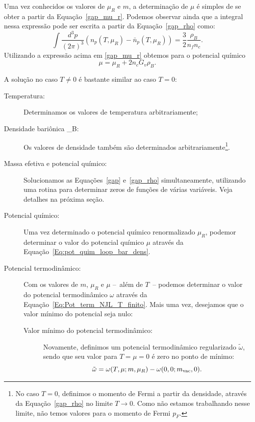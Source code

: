 Uma vez conhecidos os valores de $\mu_R$ e $m$, a determinação de $\mu$ é simples de se obter a partir da Equação~\eqref{gap_mu_r}. Podemos observar ainda que a integral nessa expressão pode ser escrita a partir da Equação~\eqref{gap_rho} como:
\begin{equation}
	\int \frac{d^3p}{(2\pi)^3}(n_p(T, \mu_R) - \bar{n}_p(T, \mu_R)) = \frac{3}{2} \frac{\rho_B}{n_f n_c}.
\end{equation}
%
Utilizando a expressão acima em \eqref{gap_mu_r} obtemos para o potencial químico
\begin{equation}\label{Eq:pot_quim_loop_bar_dens}
	\mu = \mu_R + 2 n_c G_v \rho_B.
\end{equation}

A solução no caso $T \neq 0$ é bastante similar ao caso $T = 0$: 
\begin{description}
	\item[Temperatura:] Determinamos os valores de temperatura arbitrariamente;
	\item[Densidade bariônica \rho_B:] Os valores de densidade também são determinados arbitrariamente\footnote{No caso $T = 0$, definimos o momento de Fermi a partir da densidade, através da Equação~\eqref{gap_rho} no limite $T \to 0$. Como não estamos trabalhando nesse limite, não temos valores para o momento de Fermi $p_F$.}.
	\item[Massa efetiva e potencial químico:] Solucionamos as Equações~\eqref{gap} e~\eqref{gap_rho} simultaneamente, utilizando uma rotina para determinar zeros de funções de várias variáveis. Veja detalhes na próxima seção.
	\item[Potencial químico:] Uma vez determinado o potencial químico renormalizado $\mu_R$, podemor determinar o valor do potencial químico $\mu$ através da Equação~\eqref{Eq:pot_quim_loop_bar_dens}.
	\item[Potencial termodinâmico:] Com os valores de $m$, $\mu_R$ e $\mu$ --~além de $T$~-- podemos determinar o valor do potencial termodinâmico $\omega$ através da Equação~\ref{Eq:Pot_term_NJL_T_finito}. Mais uma vez, desejamos que o valor mínimo do potencial seja nulo:
		\begin{description}
			\item[Valor mínimo do potencial termodinâmico:] Novamente, definimos um potencial termodinâmico regularizado $\tilde\omega$, sendo que seu valor para $T = \mu = 0$ é zero no ponto de mínimo:
				\begin{equation}
					\tilde\omega = \omega(T,\mu;m,\mu_R) - \omega(0,0;m_{\rm{vac}},0).

\end{equation}
\end{description}
\end{description}

